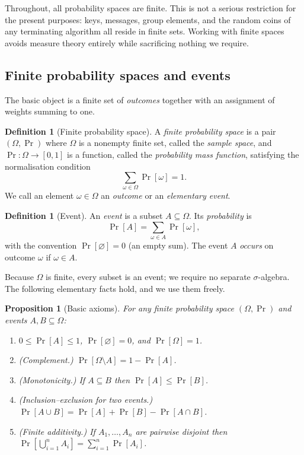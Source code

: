 \documentclass[11pt,a4paper]{article}
\newtheorem{proposition}[theorem]{Proposition}
\theoremstyle{definition}
\newtheorem{definition}[theorem]{Definition}
\theoremstyle{remark}
\begin{document}
Throughout, all probability spaces are finite. This is not a serious restriction for the present purposes: keys, messages, group elements, and the random coins of any terminating algorithm all reside in finite sets. Working with finite spaces avoids measure theory entirely while sacrificing nothing we require.

\subsection{Finite probability spaces and events}

The basic object is a finite set of \emph{outcomes} together with an assignment of weights summing to one.

\begin{definition}[Finite probability space]\label{probability:def-space}
A \emph{finite probability space} is a pair \((\Omega, \Pr)\) where \(\Omega\) is a nonempty finite set, called the \emph{sample space}, and \(\Pr\colon \Omega \to [0,1]\) is a function, called the \emph{probability mass function}, satisfying the normalisation condition
\[
\sum_{\omega \in \Omega} \Pr[\omega] = 1.
\]
We call an element \(\omega \in \Omega\) an \emph{outcome} or an \emph{elementary event}.
\end{definition}

\begin{definition}[Event]\label{probability:def-event}
An \emph{event} is a subset \(A \subseteq \Omega\). Its \emph{probability} is
\[
\Pr[A] = \sum_{\omega \in A} \Pr[\omega],
\]
with the convention \(\Pr[\varnothing] = 0\) (an empty sum). The event \(A\) \emph{occurs} on outcome \(\omega\) if \(\omega \in A\).
\end{definition}

Because \(\Omega\) is finite, every subset is an event; we require no separate \(\sigma\)-algebra. The following elementary facts hold, and we use them freely.

\begin{proposition}[Basic axioms]\label{probability:prop-axioms}
For any finite probability space \((\Omega,\Pr)\) and events \(A, B \subseteq \Omega\):
\begin{enumerate}
\item \(0 \le \Pr[A] \le 1\), \(\Pr[\varnothing] = 0\), and \(\Pr[\Omega] = 1\).
\item \emph{(Complement.)} \(\Pr[\Omega \setminus A] = 1 - \Pr[A]\).
\item \emph{(Monotonicity.)} If \(A \subseteq B\) then \(\Pr[A] \le \Pr[B]\).
\item \emph{(Inclusion--exclusion for two events.)} \(\Pr[A \cup B] = \Pr[A] + \Pr[B] - \Pr[A \cap B]\).
\item \emph{(Finite additivity.)} If \(A_1, \dots, A_n\) are pairwise disjoint then \(\Pr\!\left[\bigcup_{i=1}^n A_i\right] = \sum_{i=1}^n \Pr[A_i]\).
\end{enumerate}
\end{proposition}
\end{document}

